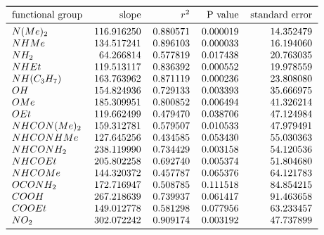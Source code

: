 \documentclass{article}
\begin{document}
\begin{align*}\begin{tabular}{lrrrr}
\toprule
                functional group &       slope &       $r^2$ &   P value &  standard error \\
\midrule
     $N(Me)_2$ &  116.916250 &  0.880571 &  0.000019 &       14.352479 \\
        $NHMe$ &  134.517241 &  0.896103 &  0.000033 &       16.194060 \\
        $NH_2$ &   64.266814 &  0.577819 &  0.017438 &       20.763035 \\
        $NHEt$ &  119.513117 &  0.836392 &  0.000552 &       19.978559 \\
  $NH(C_3H_7)$ &  163.763962 &  0.871119 &  0.000236 &       23.808080 \\
          $OH$ &  154.824936 &  0.729133 &  0.003393 &       35.666975 \\
         $OMe$ &  185.309951 &  0.800852 &  0.006494 &       41.326214 \\
         $OEt$ &  119.662499 &  0.479470 &  0.038706 &       47.124984 \\
 $NHCON(Me)_2$ &  159.312781 &  0.579507 &  0.010533 &       47.979491 \\
    $NHCONHMe$ &  127.645256 &  0.434585 &  0.053430 &       55.030363 \\
    $NHCONH_2$ &  238.119990 &  0.734429 &  0.003158 &       54.120536 \\
      $NHCOEt$ &  205.802258 &  0.692740 &  0.005374 &       51.804680 \\
      $NHCOMe$ &  144.320372 &  0.457787 &  0.065376 &       64.121783 \\
     $OCONH_2$ &  172.716947 &  0.508785 &  0.111518 &       84.854215 \\
        $COOH$ &  267.218639 &  0.739937 &  0.061417 &       91.463658 \\
       $COOEt$ &  149.012778 &  0.581298 &  0.077956 &       63.233457 \\
        $NO_2$ &  302.072242 &  0.909174 &  0.003192 &       47.737899 \\
\bottomrule
\end{tabular}

\end{align*}
\end{document}
